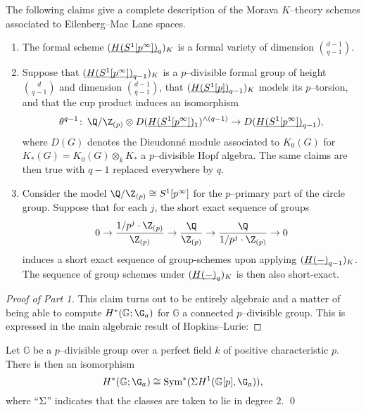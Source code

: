 \begin{theorem}\label{MainKThyOfEMSpacesTheorem}
The following claims give a complete description of the Morava $K$--theory schemes associated to Eilenberg--Mac Lane spaces.
\begin{enumerate}
    \item The formal scheme $(\underline{\smash{H(S^1[p^\infty])}}_{q})_K$ is a formal variety of dimension $\binom{d-1}{q-1}$.
    \item Suppose that $(\underline{\smash{H(S^1[p^\infty])}}_{q-1})_K$ is a $p$--divisible formal group of height $\binom{d}{q-1}$ and dimension $\binom{d-1}{q-1}$, that $(\underline{\smash{H(S^1[p])}}_{q-1})_K$ models its $p$--torsion, and that the cup product induces an isomorphism \[\theta^{q-1}\co \Q / \Z_{(p)} \otimes D(\OS{H(S^1[p^\infty])}{1})^{\wedge (q-1)} \to D(\OS{H(S^1[p^\infty])}{q-1}),\] where $D(G)$ denotes the Dieudonn\'e module associated to $K_0(G)$ for $K_*(G) = K_0(G) \otimes_k K_*$ a $p$--divisible Hopf algebra.  The same claims are then true with $q-1$ replaced everywhere by $q$.
    \item Consider the model $\Q / \Z_{(p)} \cong S^1[p^\infty]$ for the $p$--primary part of the circle group.  Suppose that for each $j$, the short exact sequence of groups \[0 \to \frac{1/p^j \cdot \Z_{(p)}}{\Z_{(p)}} \to \frac{\Q}{\Z_{(p)}} \to \frac{\Q}{1/p^j \cdot \Z_{(p)}} \to 0\] induces a short exact sequence of group-schemes upon applying $(\underline{\smash{H(-)}}_{q-1})_K$.  The sequence of group schemes under $(\underline{\smash{H(-)}}_{q})_K$ is then also short-exact.
\end{enumerate}
\end{theorem}
\begin{proof}[Proof of Part 1]\renewcommand{\qedsymbol}{\relax}
This claim turns out to be entirely algebraic and a matter of being able to compute $H^*(\mathbb G; \G_a)$ for $\mathbb G$ a connected $p$--divisible group.  This is expressed in the main algebraic result of Hopkins--Lurie:
\end{proof}

\begin{theorem}
Let $\mathbb G$ be a $p$--divisible group over a perfect field $k$ of positive characteristic $p$.  There is then an isomorphism \[H^*(\mathbb G; \G_a) \cong \Sym^*(\Susp H^1(\mathbb G[p], \G_a)),\] where ``$\Sigma$'' indicates that the classes are taken to lie in degree $2$. \qed
\end{theorem}

